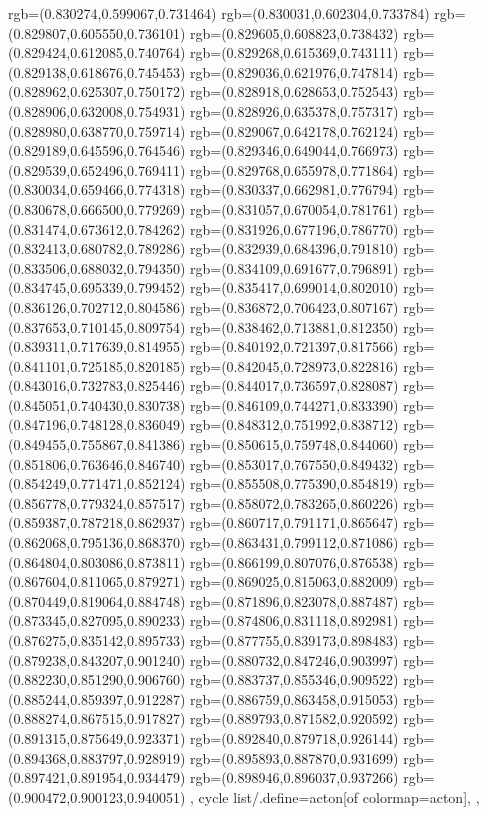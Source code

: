 {{{			rgb=(0.830274,0.599067,0.731464)
			rgb=(0.830031,0.602304,0.733784)
			rgb=(0.829807,0.605550,0.736101)
			rgb=(0.829605,0.608823,0.738432)
			rgb=(0.829424,0.612085,0.740764)
			rgb=(0.829268,0.615369,0.743111)
			rgb=(0.829138,0.618676,0.745453)
			rgb=(0.829036,0.621976,0.747814)
			rgb=(0.828962,0.625307,0.750172)
			rgb=(0.828918,0.628653,0.752543)
			rgb=(0.828906,0.632008,0.754931)
			rgb=(0.828926,0.635378,0.757317)
			rgb=(0.828980,0.638770,0.759714)
			rgb=(0.829067,0.642178,0.762124)
			rgb=(0.829189,0.645596,0.764546)
			rgb=(0.829346,0.649044,0.766973)
			rgb=(0.829539,0.652496,0.769411)
			rgb=(0.829768,0.655978,0.771864)
			rgb=(0.830034,0.659466,0.774318)
			rgb=(0.830337,0.662981,0.776794)
			rgb=(0.830678,0.666500,0.779269)
			rgb=(0.831057,0.670054,0.781761)
			rgb=(0.831474,0.673612,0.784262)
			rgb=(0.831926,0.677196,0.786770)
			rgb=(0.832413,0.680782,0.789286)
			rgb=(0.832939,0.684396,0.791810)
			rgb=(0.833506,0.688032,0.794350)
			rgb=(0.834109,0.691677,0.796891)
			rgb=(0.834745,0.695339,0.799452)
			rgb=(0.835417,0.699014,0.802010)
			rgb=(0.836126,0.702712,0.804586)
			rgb=(0.836872,0.706423,0.807167)
			rgb=(0.837653,0.710145,0.809754)
			rgb=(0.838462,0.713881,0.812350)
			rgb=(0.839311,0.717639,0.814955)
			rgb=(0.840192,0.721397,0.817566)
			rgb=(0.841101,0.725185,0.820185)
			rgb=(0.842045,0.728973,0.822816)
			rgb=(0.843016,0.732783,0.825446)
			rgb=(0.844017,0.736597,0.828087)
			rgb=(0.845051,0.740430,0.830738)
			rgb=(0.846109,0.744271,0.833390)
			rgb=(0.847196,0.748128,0.836049)
			rgb=(0.848312,0.751992,0.838712)
			rgb=(0.849455,0.755867,0.841386)
			rgb=(0.850615,0.759748,0.844060)
			rgb=(0.851806,0.763646,0.846740)
			rgb=(0.853017,0.767550,0.849432)
			rgb=(0.854249,0.771471,0.852124)
			rgb=(0.855508,0.775390,0.854819)
			rgb=(0.856778,0.779324,0.857517)
			rgb=(0.858072,0.783265,0.860226)
			rgb=(0.859387,0.787218,0.862937)
			rgb=(0.860717,0.791171,0.865647)
			rgb=(0.862068,0.795136,0.868370)
			rgb=(0.863431,0.799112,0.871086)
			rgb=(0.864804,0.803086,0.873811)
			rgb=(0.866199,0.807076,0.876538)
			rgb=(0.867604,0.811065,0.879271)
			rgb=(0.869025,0.815063,0.882009)
			rgb=(0.870449,0.819064,0.884748)
			rgb=(0.871896,0.823078,0.887487)
			rgb=(0.873345,0.827095,0.890233)
			rgb=(0.874806,0.831118,0.892981)
			rgb=(0.876275,0.835142,0.895733)
			rgb=(0.877755,0.839173,0.898483)
			rgb=(0.879238,0.843207,0.901240)
			rgb=(0.880732,0.847246,0.903997)
			rgb=(0.882230,0.851290,0.906760)
			rgb=(0.883737,0.855346,0.909522)
			rgb=(0.885244,0.859397,0.912287)
			rgb=(0.886759,0.863458,0.915053)
			rgb=(0.888274,0.867515,0.917827)
			rgb=(0.889793,0.871582,0.920592)
			rgb=(0.891315,0.875649,0.923371)
			rgb=(0.892840,0.879718,0.926144)
			rgb=(0.894368,0.883797,0.928919)
			rgb=(0.895893,0.887870,0.931699)
			rgb=(0.897421,0.891954,0.934479)
			rgb=(0.898946,0.896037,0.937266)
			rgb=(0.900472,0.900123,0.940051)
		},
	cycle list/.define={acton}{[of colormap=acton]},
	},
}
